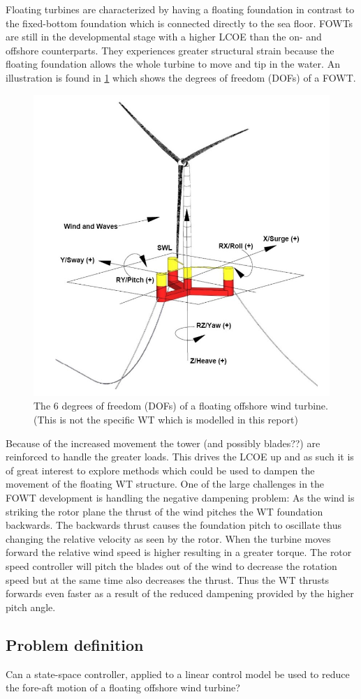 Floating turbines are characterized by having a floating foundation in contrast to the fixed-bottom foundation which is connected directly to the sea floor. FOWTs are still in the developmental stage with a higher LCOE than the on- and offshore counterparts. They experiences greater structural strain because the floating foundation allows the whole turbine to move and tip in the water. An illustration is found in \cref{fig:fowt_coordinates} which shows the degrees of freedom (DOFs) of a FOWT. 
\begin{figure}[h]
	\centering
	\includegraphics[width=0.55\linewidth]{Graphics/FOWTcoordinates.png}
	\caption{The 6 degrees of freedom (DOFs) of a floating offshore wind turbine. (This is not the specific WT which is modelled in this report) \cite{Vanelli2021}}
	\label{fig:fowt_coordinates}
\end{figure}
Because of the increased movement the tower (and possibly blades??) are reinforced to handle the greater loads. This drives the LCOE up and as such it is of great interest to explore methods which could be used to dampen the movement of the floating WT structure. One of the large challenges in the FOWT development is handling the negative dampening problem: As the wind is striking the rotor plane the thrust of the wind pitches the WT foundation backwards. The backwards thrust causes the foundation pitch to oscillate thus changing the relative velocity as seen by the rotor. When the turbine moves forward the relative wind speed is higher resulting in a greater torque. The rotor speed controller will pitch the blades out of the wind to decrease the rotation speed but at the same time also decreases the thrust. Thus the WT thrusts forwards even faster as a result of the reduced dampening provided by the higher pitch angle.



\subsection{Problem definition}
Can a state-space controller, applied to a linear control model be used to reduce the fore-aft motion of a floating offshore wind turbine?


